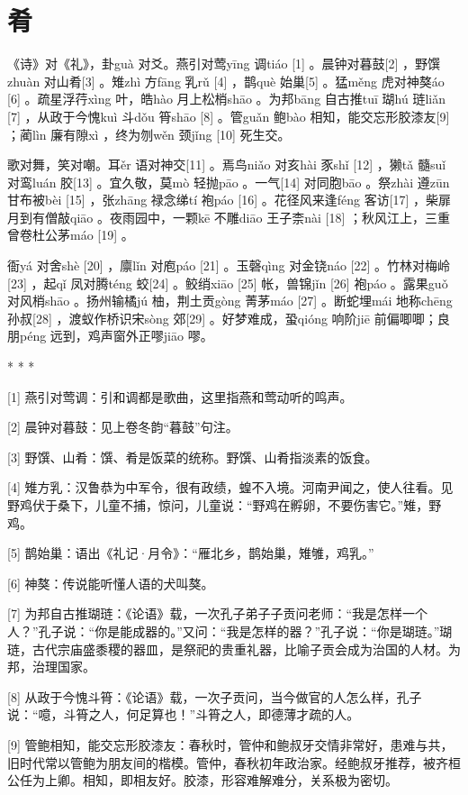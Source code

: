 \documentclass[12pt,UTF8]{ctexbook}
\begin{document}
\chapter{肴}


《诗》对《礼》，卦guà 对爻。燕引对莺yīng 调tiáo [1] 。晨钟对暮鼓[2] ，野馔zhuàn 对山肴[3] 。雉zhì 方fāng 乳rǔ [4] ，鹊què 始巢[5] 。猛měng 虎对神獒áo [6] 。疏星浮荇xìng 叶，皓hào 月上松梢shāo 。为邦bāng 自古推tuī 瑚hú 琏liǎn [7] ，从政于今愧kuì 斗dǒu 筲shāo [8] 。管guǎn 鲍bào 相知，能交忘形胶漆友[9] ；蔺lìn 廉有隙xì ，终为刎wěn 颈jǐng [10] 死生交。

歌对舞，笑对嘲。耳ěr 语对神交[11] 。焉鸟niǎo 对亥hài 豕shǐ [12] ，獭tǎ 髓suǐ 对鸾luán 胶[13] 。宜久敬，莫mò 轻抛pāo 。一气[14] 对同胞bāo 。祭zhài 遵zūn 甘布被bèi [15] ，张zhāng 禄念绨tí 袍páo [16] 。花径风来逢féng 客访[17] ，柴扉月到有僧敲qiāo 。夜雨园中，一颗kē 不雕diāo 王子柰nài [18] ；秋风江上，三重曾卷杜公茅máo [19] 。

衙yá 对舍shè [20] ，廪lǐn 对庖páo [21] 。玉磬qìng 对金铙náo [22] 。竹林对梅岭[23] ，起qǐ 凤对腾téng 蛟[24] 。鲛绡xiāo [25] 帐，兽锦jǐn [26] 袍páo 。露果guǒ 对风梢shāo 。扬州输橘jú 柚，荆土贡gòng 菁茅máo [27] 。断蛇埋mái 地称chēng 孙叔[28] ，渡蚁作桥识宋sòng 郊[29] 。好梦难成，蛩qióng 响阶jiē 前偏唧唧；良朋péng 远到，鸡声窗外正嘐jiāo 嘐。



* * *



[1] 燕引对莺调：引和调都是歌曲，这里指燕和莺动听的鸣声。

[2] 晨钟对暮鼓：见上卷冬韵“暮鼓”句注。

[3] 野馔、山肴：馔、肴是饭菜的统称。野馔、山肴指淡素的饭食。

[4] 雉方乳：汉鲁恭为中军令，很有政绩，蝗不入境。河南尹闻之，使人往看。见野鸡伏于桑下，儿童不捕，惊问，儿童说：“野鸡在孵卵，不要伤害它。”雉，野鸡。

[5] 鹊始巢：语出《礼记·月令》：“雁北乡，鹊始巢，雉雊，鸡乳。”

[6] 神獒：传说能听懂人语的犬叫獒。

[7] 为邦自古推瑚琏：《论语》载，一次孔子弟子子贡问老师：“我是怎样一个人？”孔子说：“你是能成器的。”又问：“我是怎样的器？”孔子说：“你是瑚琏。”瑚琏，古代宗庙盛黍稷的器皿，是祭祀的贵重礼器，比喻子贡会成为治国的人材。为邦，治理国家。

[8] 从政于今愧斗筲：《论语》载，一次子贡问，当今做官的人怎么样，孔子说：“噫，斗筲之人，何足算也！”斗筲之人，即德薄才疏的人。

[9] 管鲍相知，能交忘形胶漆友：春秋时，管仲和鲍叔牙交情非常好，患难与共，旧时代常以管鲍为朋友间的楷模。管仲，春秋初年政治家。经鲍叔牙推荐，被齐桓公任为上卿。相知，即相友好。胶漆，形容难解难分，关系极为密切。
\end{document}
